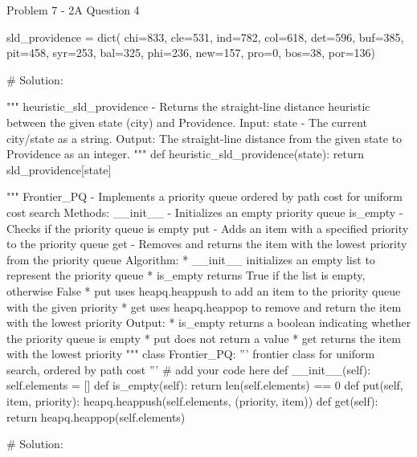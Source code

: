 \begin{problem}{Problem 7 - 2A Question 4}
\begin{highlight}[Solution]
\begin{code}[Python]
    sld_providence = dict(
        chi=833,
        cle=531,
        ind=782,
        col=618,
        det=596,
        buf=385,
        pit=458,
        syr=253,
        bal=325,
        phi=236,
        new=157,
        pro=0,
        bos=38,
        por=136)
    
    # Solution:
    
    """ heuristic_sld_providence - Returns the straight-line distance heuristic between the given state (city) and Providence.
        Input:
            state - The current city/state as a string.
        Output:
            The straight-line distance from the given state to Providence as an integer.
    """
    def heuristic_sld_providence(state):
        return sld_providence[state]
    
    """ Frontier_PQ - Implements a priority queue ordered by path cost for uniform cost search
        Methods:
            __init__ - Initializes an empty priority queue
            is_empty - Checks if the priority queue is empty
            put - Adds an item with a specified priority to the priority queue
            get - Removes and returns the item with the lowest priority from the priority queue
        Algorithm:
            * __init__ initializes an empty list to represent the priority queue
            * is_empty returns True if the list is empty, otherwise False
            * put uses heapq.heappush to add an item to the priority queue with the given priority
            * get uses heapq.heappop to remove and return the item with the lowest priority
        Output:
            * is_empty returns a boolean indicating whether the priority queue is empty
            * put does not return a value
            * get returns the item with the lowest priority
    """
    class Frontier_PQ:
        ''' frontier class for uniform search, ordered by path cost '''
        # add your code here
        def __init__(self):
            self.elements = []
        def is_empty(self):
            return len(self.elements) == 0
        def put(self, item, priority):
            heapq.heappush(self.elements, (priority, item))
        def get(self):
            return heapq.heappop(self.elements)
    
    # Solution:
    

\end{code}
\end{highlight}
\end{problem}
